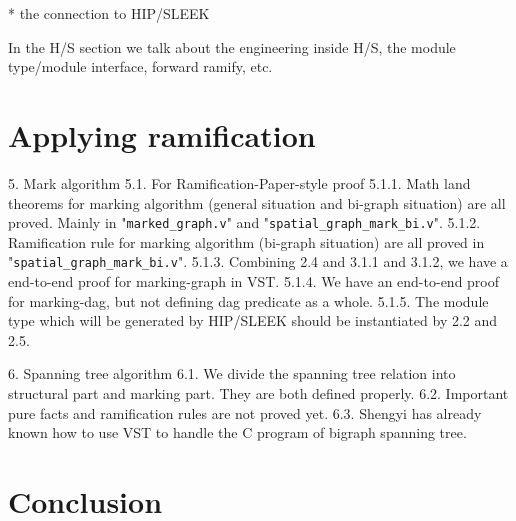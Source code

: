 \documentclass[pldi]{sigplanconf-pldi15}
\begin{document}
* the connection to HIP/SLEEK

In the H/S section we talk about the engineering inside H/S, the module type/module interface, forward ramify, etc.

\section{Applying ramification}

5. Mark algorithm
5.1. For Ramification-Paper-style proof
5.1.1. Math land theorems for marking algorithm (general situation and bi-graph situation) are all proved. Mainly in "\texttt{marked\_graph.v}" and "\texttt{spatial\_graph\_mark\_bi.v}".
5.1.2. Ramification rule for marking algorithm (bi-graph situation) are all proved in "\texttt{spatial\_graph\_mark\_bi.v}".
5.1.3. Combining 2.4 and 3.1.1 and 3.1.2, we have a end-to-end proof for marking-graph in VST.
5.1.4. We have an end-to-end proof for marking-dag, but not defining dag predicate as a whole.
5.1.5. The module type which will be generated by HIP/SLEEK should be instantiated by 2.2 and 2.5.

6. Spanning tree algorithm
6.1. We divide the spanning tree relation into structural part and marking part. They are both defined properly.
6.2. Important pure facts and ramification rules are not proved yet.
6.3. Shengyi has already known how to use VST to handle the C program of bigraph spanning tree.



\section{Conclusion}



\end{document}
